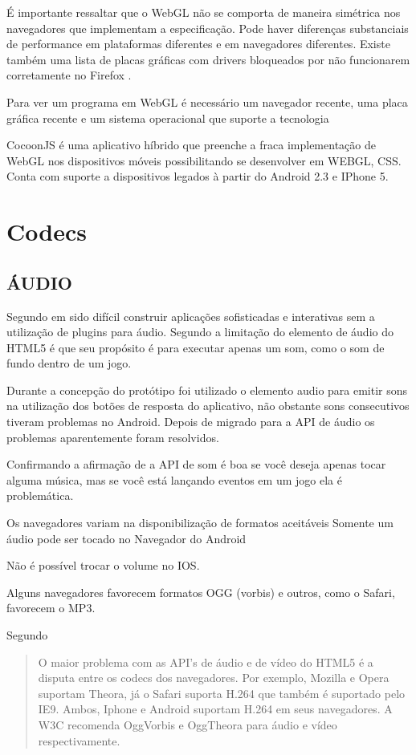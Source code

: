É importante ressaltar que o WebGL não se comporta de maneira
simétrica nos navegadores que implementam a especificação. Pode haver
diferenças substanciais de performance em plataformas diferentes e em
navegadores diferentes. Existe também uma lista de placas gráficas
com drivers bloqueados por não funcionarem corretamente no Firefox
\autocite[pp.42]{3daps}.

Para ver um programa em WebGL é necessário um navegador recente, uma
placa gráfica recente e um sistema operacional que suporte a tecnologia
\autocite{html5mostwanted}

CocoonJS é uma aplicativo híbrido que preenche a fraca implementação
de WebGL nos dispositivos móveis possibilitando se desenvolver em
WEBGL, CSS. Conta com suporte a dispositivos legados à partir do
Android 2.3 e IPhone 5.

\section{Codecs}

\subsection{ÁUDIO}

Segundo \cite{browserGamesTechnologyAndFuture} em sido difícil
construir aplicações sofisticadas e interativas sem a utilização de
plugins para áudio.
Segundo \cite{html5mostwanted} a limitação do elemento de áudio do
HTML5 é que seu propósito é para executar apenas um som, como o som
de fundo dentro de um jogo.

Durante a concepção do protótipo foi utilizado o elemento audio
para emitir sons na utilização dos botões de resposta do aplicativo, 
não obstante sons consecutivos tiveram problemas no Android. 
Depois de migrado para a API  de áudio os problemas aparentemente foram 
resolvidos. 

Confirmando a afirmação de \cite{html5mostwanted} a API de som é
boa se você deseja apenas tocar alguma música, mas se você está
lançando eventos em um jogo ela é problemática.

Os navegadores variam na disponibilização de formatos aceitáveis
Somente um áudio pode ser tocado no Navegador do Android

Não é possível trocar o volume no IOS.

Alguns navegadores favorecem formatos OGG (vorbis) e outros, como o
Safari, favorecem o MP3.

Segundo \cite{html5Tradeoffs}
\begin{quote}
O maior problema com as API's de áudio e de vídeo do HTML5 é
a disputa entre os codecs dos navegadores. Por exemplo, Mozilla e
Opera suportam Theora, já o Safari suporta H.264 que também é
suportado pelo IE9. Ambos, Iphone e Android suportam H.264 em seus
navegadores. A W3C recomenda OggVorbis e OggTheora para áudio e vídeo
respectivamente.
\end{quote}

